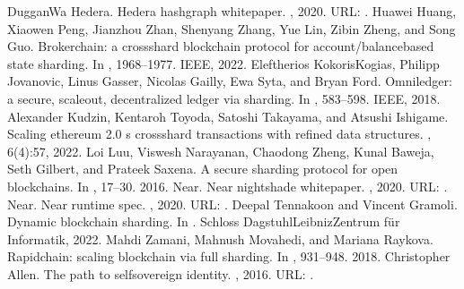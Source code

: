 \documentclass[letterpaper,10pt,english]{jupyterBook}
\begin{document}
\begin{sphinxthebibliography}{DugganWa}
Hedera. Hedera hashgraph whitepaper. , 2020. URL: .
\sphinxAtStartPar
Huawei Huang, Xiaowen Peng, Jianzhou Zhan, Shenyang Zhang, Yue Lin, Zibin Zheng, and Song Guo. Brokerchain: a cross\sphinxhyphen{}shard blockchain protocol for account/balance\sphinxhyphen{}based state sharding. In , 1968–1977. IEEE, 2022.
\sphinxAtStartPar
Eleftherios Kokoris\sphinxhyphen{}Kogias, Philipp Jovanovic, Linus Gasser, Nicolas Gailly, Ewa Syta, and Bryan Ford. Omniledger: a secure, scale\sphinxhyphen{}out, decentralized ledger via sharding. In , 583–598. IEEE, 2018.
\sphinxAtStartPar
Alexander Kudzin, Kentaroh Toyoda, Satoshi Takayama, and Atsushi Ishigame. Scaling ethereum 2.0 s cross\sphinxhyphen{}shard transactions with refined data structures. , 6(4):57, 2022.
\sphinxAtStartPar
Loi Luu, Viswesh Narayanan, Chaodong Zheng, Kunal Baweja, Seth Gilbert, and Prateek Saxena. A secure sharding protocol for open blockchains. In , 17–30. 2016.
\sphinxAtStartPar
Near. Near nightshade whitepaper. , 2020. URL: .
\sphinxAtStartPar
Near. Near runtime spec. , 2020. URL: .
\sphinxAtStartPar
Deepal Tennakoon and Vincent Gramoli. Dynamic blockchain sharding. In . Schloss Dagstuhl\sphinxhyphen{}Leibniz\sphinxhyphen{}Zentrum für Informatik, 2022.
\sphinxAtStartPar
Mahdi Zamani, Mahnush Movahedi, and Mariana Raykova. Rapidchain: scaling blockchain via full sharding. In , 931–948. 2018.
\sphinxAtStartPar
Christopher Allen. The path to self\sphinxhyphen{}sovereign identity. , 2016. URL: .

\end{sphinxthebibliography}
\end{document}
